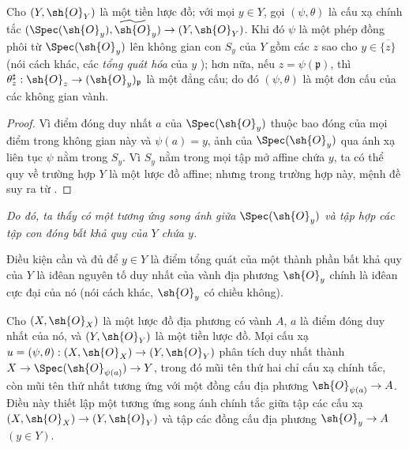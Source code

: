 \documentclass[oneside]{amsart}
\makeatletter
\newcommand{\ega@arrow}[2]{\mathchoice{#1}{#2}{#2}{#2}}
\renewcommand{\to}{\ega@arrow{\longrightarrow}{\rightarrow}}
\newcommand{\oldpage}[2][]{{\marginnote{\normalfont\textbf{#1}~|~#2}}\ignorespaces}
\let\EGAOriginalLabel\label
\renewcommand{\label}[1]{\phantomsection\EGAOriginalLabel{#1}}
\makeatother
\begin{document}
\begin{proposition}[2.4.2]
\label{I.2.4.2}
\oldpage[I]{102}
Cho $(Y,\sh{O}_Y)$ là một tiền lược đồ; với mọi $y\in Y$, gọi
$(\psi,\theta)$ là cấu xạ chính tắc
$(\Spec(\sh{O}_y),\widetilde{\sh{O}}_y)\to(Y,\sh{O}_Y)$. Khi đó $\psi$
là một phép đồng phôi từ $\Spec(\sh{O}_y)$ lên không gian con $S_y$ của
$Y$ gồm các $z$ sao cho $y\in\overline{\{z\}}$ (nói cách khác, các
\emph{tổng quát hóa} của $y$ ); hơn nữa, nếu
$z=\psi(\mathfrak{p})$, thì
$\theta_z^{\sharp}:\sh{O}_z\to(\sh{O}_y)_{\mathfrak{p}}$ là một đẳng
cấu; do đó $(\psi,\theta)$ là một đơn cấu của các không gian vành.
\end{proposition}

\begin{proof}
Vì điểm đóng duy nhất $a$ của $\Spec(\sh{O}_y)$ thuộc bao đóng của mọi
điểm trong không gian này và $\psi(a)=y$, ảnh của
$\Spec(\sh{O}_y)$ qua ánh xạ liên tục $\psi$ nằm trong $S_y$. Vì $S_y$
nằm trong mọi tập mở affine chứa $y$, ta có thể quy về trường hợp $Y$ là
một lược đồ affine; nhưng trong trường hợp này, mệnh đề suy ra từ
.
\end{proof}

\emph{Do đó, ta thấy  có một tương ứng song ánh giữa
$\Spec(\sh{O}_y)$ và tập hợp các tập con đóng bất khả quy của $Y$ chứa
$y$.}

\begin{corollary}[2.4.3]
\label{I.2.4.3}
Điều kiện cần và đủ để $y\in Y$ là điểm tổng quát của một thành phần bất
khả quy của $Y$ là iđêan nguyên tố duy nhất của vành địa phương
$\sh{O}_y$ chính là iđêan cực đại của nó (nói cách khác,
$\sh{O}_y$ có chiều không).
\end{corollary}

\begin{proposition}[2.4.4]
\label{I.2.4.4}
Cho $(X,\sh{O}_X)$ là một lược đồ địa phương có vành $A$, $a$ là điểm
đóng duy nhất của nó, và $(Y,\sh{O}_Y)$ là một tiền lược đồ. Mọi cấu xạ
$u=(\psi,\theta):(X,\sh{O}_X)\to(Y,\sh{O}_Y)$ phân tích duy nhất thành
$X\to\Spec(\sh{O}_{\psi(a)})\to Y$, trong đó mũi tên thứ hai chỉ cấu xạ
chính tắc, còn mũi tên thứ nhất tương ứng với một đồng cấu địa phương
$\sh{O}_{\psi(a)}\to A$. Điều này thiết lập một tương ứng song ánh chính
tắc giữa tập các cấu xạ $(X,\sh{O}_X)\to(Y,\sh{O}_Y)$ và tập các đồng
cấu địa phương $\sh{O}_y\to A$ $(y\in Y)$.
\end{proposition}
\end{document}
